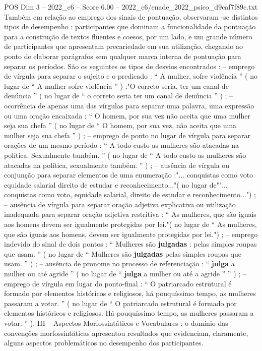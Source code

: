\begin{textsample}{POS Dim 3 – 2022\_c6 – Score 6.00 – 2022\_c6/enade\_2022\_psico\_d9caf7f89c.txt}
Também em relação ao emprego dos sinais de pontuação, observaram -se distintos tipos de desempenho : participantes que dominam a funcionalidade da pontuação para a construção de textos fluentes e coesos, por um lado, e um grande número de participantes que apresentam precariedade em sua utilização, chegando ao ponto de elaborar parágrafos sem qualquer marca interna de pontuação para separar os períodos.
São os seguintes os tipos de desvios encontrados : – emprego de vírgula para separar o sujeito e o predicado : “ A mulher, sofre violência ” ( no lugar de “ A mulher sofre violência ” ) ;"O correto seria, ter um canal de denúncia ” ( no lugar de “ o correto seria ter um canal de denúncia ” ) ; – ocorrência de apenas uma das vírgulas para separar uma palavra, uma expressão ou uma oração encaixada : “ O homem, por sua vez não aceita que uma mulher seja sua chefa ” ( no lugar de “ O homem, por sua vez, não aceita que uma mulher seja sua chefa ” ) ; – emprego de ponto no lugar de vírgula para separar orações de um mesmo período : “ A todo custo as mulheres são atacadas na política.
Sexualmente também. ” ( no lugar de “ A todo custo as mulheres são atacadas na política, sexualmente também. ” ) ; – ausência de vírgula ou conjunção para separar elementos de uma enumeração :"... conquistas como voto equidade salarial direito de estudar e reconhecimento..."( no lugar de""... conquistas como voto, equidade salarial, direito de estudar e reconhecimento...") ; – ausência de vírgula para separar oração adjetiva explicativa ou utilização inadequada para separar oração adjetiva restritiva : “ As mulheres, que são iguais aos homens devem ser igualmente protegidas por lei."( no lugar de “ As mulheres, que são iguais aos homens, devem ser igualmente protegidas por lei.") ; – emprego indevido do sinal de dois pontos : “ Mulheres são \textbf{julgadas} : pelas simples roupas que usam. ” ( no lugar de “ Mulheres são \textbf{julgadas} pelas simples roupas que usam. ” ) ; – ausência de pronome no processo de referenciação : “ \textbf{julga} a mulher ou até agride ” ( no lugar de “ \textbf{julga} a mulher ou até a agride ” ” ) ; – emprego de vírgula em lugar do ponto-final : “ O patriarcado estrutural é formado por elementos históricos e religiosos, há pouquíssimo tempo, as mulheres passaram a votar. ” ( no lugar de “ O patriarcado estrutural é formado por elementos históricos e religiosos.
Há pouquíssimo tempo, as mulheres passaram a votar. ” ).
III – Aspectos Morfossintáticos e Vocabulares : o domínio das convenções morfossintáticas apresentou resultados que evidenciam, claramente, alguns aspectos problemáticos no desempenho dos participantes.

\end{textsample}
